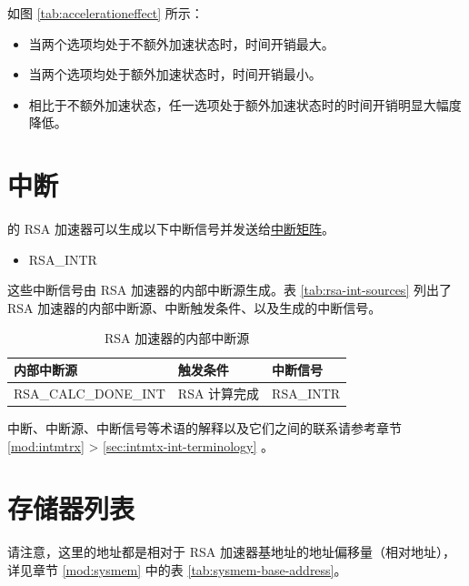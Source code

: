 \documentclass[main\_\_CN.tex]{subfiles}
\begin{document}
如图 \ref{tab:accelerationeffect} 所示：
\begin{itemize}
    \item 当两个选项均处于不额外加速状态时，时间开销最大。
    \item 当两个选项均处于额外加速状态时，时间开销最小。
    \item 相比于不额外加速状态，任一选项处于额外加速状态时的时间开销明显大幅度降低。
\end{itemize}



\section{中断}

\chipname{} 的 RSA 加速器可以生成以下中断信号并发送给\hyperref[mod:intmtrx]{中断矩阵}。

    \begin{itemize}
        \item RSA\_INTR
    \end{itemize}

这些中断信号由 RSA 加速器的内部中断源生成。表 \ref{tab:rsa-int-sources} 列出了 RSA 加速器的内部中断源、中断触发条件、以及生成的中断信号。

\begin{longtable}{ | L{5cm} | L{6.5cm} | L{4cm} | }
\caption{RSA 加速器的内部中断源} \label{tab:rsa-int-sources}
\\ \hline
{}
\textbf{内部中断源} & \textbf{触发条件}  &  \textbf{中断信号}\\ \hline
\label{int:RSACALCDONEINT}RSA\_CALC\_DONE\_INT  &  RSA 计算完成 &  RSA\_INTR  \\ \hline
\end{longtable}

\begin{tiplisting}
中断、中断源、中断信号等术语的解释以及它们之间的联系请参考章节 \ref{mod:intmtrx} \textit{} > \ref{sec:intmtx-int-terminology} \textit{}。
\end{tiplisting}


\newpage
\section{存储器列表 }\label{sec:mem-sum}
请注意，这里的地址都是相对于 RSA 加速器基地址的地址偏移量（相对地址），详见章节 \ref{mod:sysmem} \textit{} 中的表 \ref{tab:sysmem-base-address}。
\end{document}
